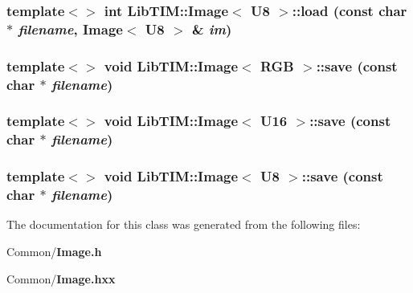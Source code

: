 \subsubsection{\setlength{\rightskip}{0pt plus 5cm}template$<$$>$ int {\bf Lib\-TIM::Image}$<$ {\bf U8} $>$::load (const char $\ast$ {\em filename}, {\bf Image}$<$ {\bf U8} $>$ \& {\em im})\hspace{0.3cm}{\tt  [inline]}}\label{classLibTIM_1_1Image_a61}


\subsubsection{\setlength{\rightskip}{0pt plus 5cm}template$<$$>$ void {\bf Lib\-TIM::Image}$<$ {\bf RGB} $>$::save (const char $\ast$ {\em filename})\hspace{0.3cm}{\tt  [inline]}}\label{classLibTIM_1_1Image_a66}


\subsubsection{\setlength{\rightskip}{0pt plus 5cm}template$<$$>$ void {\bf Lib\-TIM::Image}$<$ {\bf U16} $>$::save (const char $\ast$ {\em filename})\hspace{0.3cm}{\tt  [inline]}}\label{classLibTIM_1_1Image_a65}


\subsubsection{\setlength{\rightskip}{0pt plus 5cm}template$<$$>$ void {\bf Lib\-TIM::Image}$<$ {\bf U8} $>$::save (const char $\ast$ {\em filename})\hspace{0.3cm}{\tt  [inline]}}\label{classLibTIM_1_1Image_a64}




The documentation for this class was generated from the following files:\begin{CompactItemize}
\item 
Common/{\bf Image.h}\item 
Common/{\bf Image.hxx}\end{CompactItemize}
